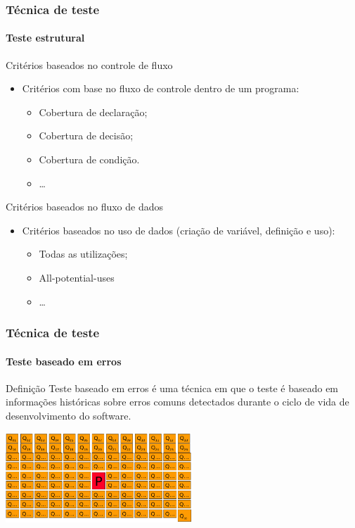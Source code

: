 \begin{frame}
\frametitle{Técnica de teste}
\framesubtitle{Teste estrutural}
\label{concept:structural-testing-criteria}

\begin{block:fact}{Critérios baseados no controle de fluxo}
\begin{itemize}
	\item Critérios com base no fluxo de controle dentro de um programa:
	\begin{itemize}
		\item Cobertura de declaração;
		\item Cobertura de decisão;
		\item Cobertura de condição.
		\item \ldots
	\end{itemize}
\end{itemize}
\end{block:fact}


\begin{block:fact}{Critérios baseados no fluxo de dados}
\begin{itemize}
	\item Critérios baseados no uso de dados (criação de variável, definição e uso):
	\begin{itemize}
		\item Todas as utilizações;
		\item All-potential-uses
		\item \ldots
	\end{itemize}
\end{itemize}
\end{block:fact}


\hfill
{}
\end{frame}




\begin{frame}
\frametitle{Técnica de teste}
\framesubtitle{Teste baseado em erros}
\label{concept:fault-based-testing}

\begin{block:concept}{Definição}
Teste baseado em erros é uma técnica em que o teste é baseado em informações históricas sobre erros comuns detectados durante o ciclo de vida de desenvolvimento do software. 
\end{block:concept}

\begin{block:fact}{}
    \centering
    \includegraphics[width=7cm]{teste-de-software/conceitos-basicos/Imagens/mutation-testing}
\end{block:fact}
\end{frame}


